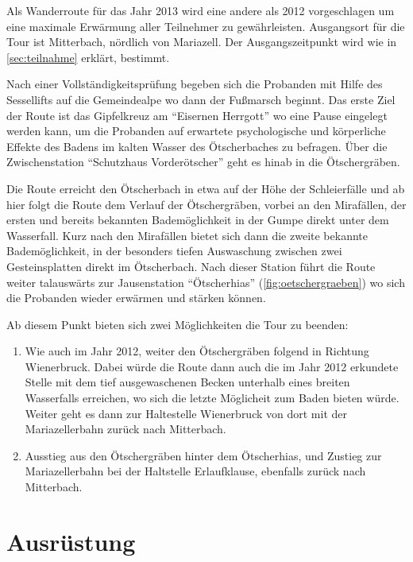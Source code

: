 \documentclass[twoside]{article}
\begin{document}
\begin{multicols}{2}
Als Wanderroute für das Jahr 2013 wird eine andere als 2012 vorgeschlagen um eine maximale Erwärmung aller Teilnehmer zu gewährleisten. Ausgangsort für die Tour
ist Mitterbach, nördlich von Mariazell. Der Ausgangszeitpunkt wird wie in \cref{sec:teilnahme} erklärt, bestimmt.

Nach einer Vollständigkeitsprüfung begeben sich die Probanden mit Hilfe des Sessellifts auf die Gemeindealpe wo dann der Fußmarsch beginnt. Das erste Ziel der
Route ist das Gipfelkreuz am "`Eisernen Herrgott"' wo eine Pause eingelegt werden kann, um die Probanden auf erwartete psychologische und körperliche
Effekte des Badens im kalten Wasser des Ötscherbaches zu befragen. Über die Zwischenstation "`Schutzhaus Vorderötscher"' geht es hinab in die Ötschergräben.

Die Route erreicht den Ötscherbach in etwa auf der Höhe der Schleierfälle und ab hier folgt die Route dem Verlauf der Ötschergräben, vorbei an den Mirafällen,
der ersten und bereits bekannten Bademöglichkeit in der Gumpe direkt unter dem Wasserfall. Kurz nach den Mirafällen bietet sich dann die zweite bekannte
Bademöglichkeit, in der besonders tiefen Auswaschung zwischen zwei Gesteinsplatten direkt im Ötscherbach. Nach dieser Station führt die Route weiter talauswärts
zur Jausenstation "`Ötscherhias"' (\cref{fig:oetschergraeben}) wo sich die Probanden wieder erwärmen und stärken können.

Ab diesem Punkt bieten sich zwei Möglichkeiten die Tour zu beenden:

\begin{enumerate}
    \item Wie auch im Jahr 2012, weiter den Ötschergräben folgend in Richtung Wienerbruck. Dabei würde die Route dann auch die im Jahr 2012 erkundete Stelle mit
        dem tief ausgewaschenen Becken unterhalb eines breiten Wasserfalls erreichen, wo sich die letzte Möglicheit zum Baden bieten würde. Weiter geht es dann
        zur Haltestelle Wienerbruck von dort mit der Mariazellerbahn zurück nach Mitterbach.
    \item Ausstieg aus den Ötschergräben hinter dem Ötscherhias, und Zustieg zur Mariazellerbahn bei der Haltstelle Erlaufklause, ebenfalls zurück nach
        Mitterbach.
\end{enumerate}


\section{Ausrüstung}


\end{multicols}
\end{document}

